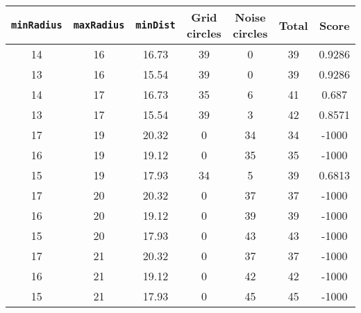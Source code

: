 \documentclass[letterpaper, 12pt]{article}
\begin{document}
\begin{longtable}{|c|c|c|c|c|c|c|}
\hline
\textbf{\texttt{minRadius}} & \textbf{\texttt{maxRadius}} & \textbf{\texttt{minDist}} & \textbf{Grid circles} & \textbf{Noise circles} & \textbf{Total} & \textbf{Score} \\
\hline
14 & 16 & 16.73 & 39 & 0 & 39 & 0.9286 \\
\hline
13 & 16 & 15.54 & 39 & 0 & 39 & 0.9286 \\
\hline
14 & 17 & 16.73 & 35 & 6 & 41 & 0.687 \\
\hline
13 & 17 & 15.54 & 39 & 3 & 42 & 0.8571 \\
\hline
17 & 19 & 20.32 & 0 & 34 & 34 & -1000 \\
\hline
16 & 19 & 19.12 & 0 & 35 & 35 & -1000 \\
\hline
15 & 19 & 17.93 & 34 & 5 & 39 & 0.6813 \\
\hline
17 & 20 & 20.32 & 0 & 37 & 37 & -1000 \\
\hline
16 & 20 & 19.12 & 0 & 39 & 39 & -1000 \\
\hline
15 & 20 & 17.93 & 0 & 43 & 43 & -1000 \\
\hline
17 & 21 & 20.32 & 0 & 37 & 37 & -1000 \\
\hline
16 & 21 & 19.12 & 0 & 42 & 42 & -1000 \\
\hline
15 & 21 & 17.93 & 0 & 45 & 45 & -1000 \\
\hline
\end{longtable}
\end{document}
